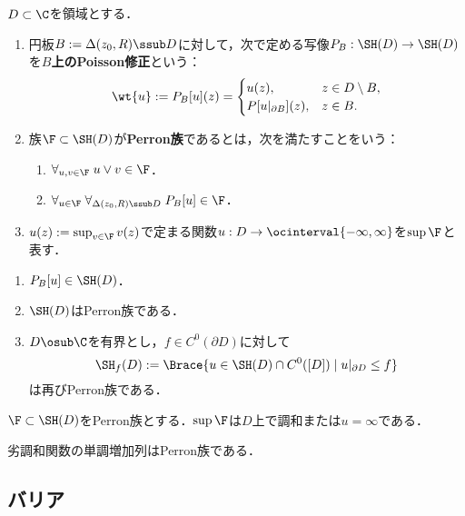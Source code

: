 \documentclass[uplatex,dvipdfmx]{jsreport}
\begin{document}
\begin{definition}
    $D\subset\C$を領域とする．
    \begin{enumerate}
        \item 円板$B:=\Delta(z_0,R)\ssub D$に対して，次で定める写像$P_B:\SH(D)\to\SH(D)$を\textbf{$B$上のPoisson修正}という：
        \[\wt{u}:=P_B[u](z)=\begin{cases}
            u(z),&z\in D\setminus B,\\
            P[u|_{\partial B}](z),&z\in B.
        \end{cases}\]
        \item 族$\F\subset\SH(D)$が\textbf{Perron族}であるとは，次を満たすことをいう：
        \begin{enumerate}
            \item $\forall_{u,v\in\F}\;u\lor v\in\F$．
            \item $\forall_{u\in\F}\;\forall_{\Delta(z_0,R)\ssub D}\;P_B[u]\in\F$．
        \end{enumerate}
        \item $u(z):=\sup_{v\in\F}v(z)$で定まる関数$u:D\to\ocinterval{-\infty,\infty}$を$\sup\F$と表す．
    \end{enumerate}
\end{definition}

\begin{lemma}\mbox{}
    \begin{enumerate}
        \item $P_B[u]\in\SH(D)$．
        \item $\SH(D)$はPerron族である．
        \item $D\osub\C$を有界とし，$f\in C^0(\partial D)$に対して
        \[\SH_f(D):=\Brace{u\in\SH(D)\cap C^0([D])\mid u|_{\partial D}\le f}\]
        は再びPerron族である．
    \end{enumerate}
\end{lemma}

\begin{theorem}[一般化されたHarnackの定理]
    $\F\subset\SH(D)$をPerron族とする．$\sup\F$は$D$上で調和または$u=\infty$である．
\end{theorem}
\begin{remarks}
    劣調和関数の単調増加列はPerron族である．
\end{remarks}

\subsection{バリア}
\end{document}
